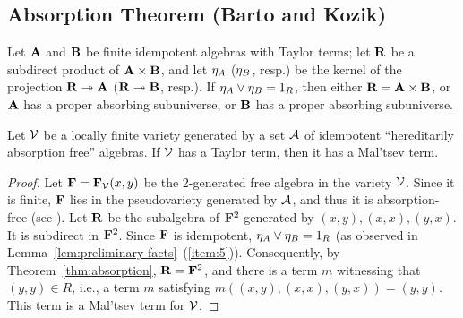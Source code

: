 \subsection{Absorption Theorem (Barto and Kozik)}
\begin{theorem}
\label{thm:absorption}
Let $\mathbf{A}$ and $\mathbf{B}$ be finite
idempotent algebras with Taylor terms; let $\mathbf{R}$ be a subdirect product of
$\mathbf{A} \times \mathbf{B}$, and let $\eta_A$ ($\eta_B$, resp.) be the kernel of the
projection $\mathbf{R} \twoheadrightarrow \mathbf{A}$ ($\mathbf{R} \twoheadrightarrow \mathbf{B}$, resp.).
If $\eta_A \vee \eta_B = 1_R$, then either $\mathbf{R} = \mathbf{A} \times \mathbf{B}$, or
$\mathbf{A}$ has a proper absorbing subuniverse, or $\mathbf{B}$ has a proper absorbing subuniverse.
\end{theorem}


\begin{theorem}
  Let $\mathcal{V}$ be a locally finite variety generated by a set $\mathcal{A}$ of
  idempotent ``hereditarily absorption free'' algebras.
  If $\mathcal{V}$ has a Taylor term, then it has a Mal'tsev term.
\end{theorem}
\begin{proof}
  Let $\mathbf{F} = \mathbf{F}_{\mathcal{V}}(x,y)$ be the 2-generated free algebra
  in the variety $\mathcal{V}$. Since it is
  finite, $\mathbf{F}$ lies in the pseudovariety generated by $\mathcal{A}$, and thus it is
  absorption-free (see \cite[Proposition 2.1.(1)]{MR3374664}).
  Let $\mathbf{R}$ be the subalgebra of $\mathbf{F}^2$ generated by
  $(x, y), (x, x), (y, x)$. It is subdirect in $\mathbf{F}^2$.
  Since $\mathbf{F}$ is idempotent, $\eta_A \vee \eta_B = 1_R$
  (as observed in Lemma~\ref{lem:preliminary-facts}~(\ref{item:5})).
  Consequently, by Theorem~\ref{thm:absorption},
  $\mathbf{R} = \mathbf{F}^2$, and there is a term $m$ witnessing
  that $(y, y) \in R$, i.e., a term $m$ satisfying
  $m((x, y), (x, x), (y, x)) = (y, y)$. This
  term is a Mal'tsev term for $\mathcal{V}$.
\end{proof}

